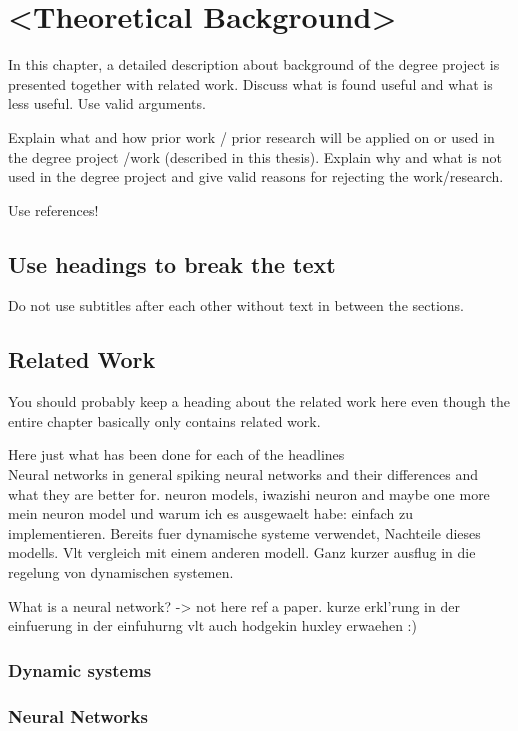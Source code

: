 \chapter{<Theoretical Background>}
In this chapter, a detailed description about background of the degree project is presented together with related work. Discuss what is found useful and what is less useful. Use valid arguments.

Explain what and how prior work / prior research will be applied on or used in the degree project /work (described in this thesis). Explain why and what is not used in the degree project and give valid reasons for rejecting the work/research.

Use references!

\section{Use headings to break the text}
Do not use subtitles after each other without text in between the sections.

\section{Related Work}
You should probably keep a heading about the related work here even though the entire chapter basically only contains related work.

Here just what has been done for each of the headlines\\


Neural networks in general
spiking neural networks and their differences and what they are better for.
neuron models, iwazishi neuron and maybe one more
mein neuron model und warum ich es ausgewaelt habe: einfach zu implementieren. Bereits fuer dynamische systeme verwendet,
Nachteile dieses modells.
Vlt vergleich mit einem anderen modell.
Ganz kurzer ausflug in die regelung von dynamischen systemen.


What is a neural network? -> not here ref a paper. kurze erkl'rung in der einfuerung
in der einfuhurng vlt auch hodgekin huxley erwaehen :)
\subsection{Dynamic systems}

\subsection{Neural Networks}


